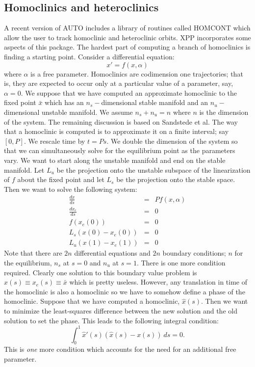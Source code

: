 \documentclass{article}
\begin{document}
\subsection{Homoclinics and heteroclinics}  A recent version of AUTO
includes a library of routines called HOMCONT which allow the user to
track homoclinic and heteroclinic orbits.  XPP incorporates some
aspects of this package. The hardest part of computing a branch of
homoclinics is finding a starting point.  Consider a differential
equation:
\[
 x'=f(x,\alpha)
\]
where $\alpha$ is a free parameter. Homoclinics are codimension one
trajectories; that is, they are expected to occur only at a particular
value of a parameter, say, $\alpha=0.$  We suppose that we have
computed an approximate homoclinic to the fixed point $\bar{x}$ which
has an $n_s-$dimensional stable manifold and an $n_u-$dimensional
unstable manifold. We assume $n_s+n_u=n$ where $n$ is the dimension of
the system. The remaining discussion is based on Sandstede et al.
The way that a homoclinic is computed is to
approximate it on a finite interval; say $[0,P].$ We rescale time by
$t=Ps.$ We double the dimension of the system so that we can
simultaneously solve for the equilibrium point as the parameters vary.
We want to start along the unstable manifold and end on the stable
manifold. Let $L_u$ be the projection onto the unstable subspace of
the linearization of $f$ about the fixed point and let $L_s$ be the
projection onto the stable space.  Then we want to solve the following
system:
\begin{eqnarray*}
\frac{dx}{ds} &=& P f(x,\alpha) \\
\frac{dx_e}{ds}&=& 0 \\
f(x_e(0)) &=& 0 \\
L_s (x(0)-x_e(0)) &=& 0 \\
L_u (x(1)-x_e(1)) &=& 0
\end{eqnarray*}
Note that there are $2n$ differential equations and $2n$ boundary
conditions; $n$ for the equilibrium, $n_s$ at $s=0$ and $n_u$ at
$s=1.$  There is one more condition required.  Clearly one solution to
this boundary value problem is $x(s)\equiv x_e(s)\equiv \bar{x}$ which
is pretty useless.  However, any translation in time of the homoclinic
is also a homoclinic so we have to somehow define a phase of the
homoclinic.  Suppose that we have computed a homoclinic, $\hat{x}(s).$
Then we want to minimize the least-squares difference between the new
solution and the old solution to set the phase. This leads to the
following integral condition:
\[
 \int_0^1 \hat{x}'(s)(\hat{x}(s)-x(s))\ ds = 0.
\]
This is {\em one} more condition which accounts for the need for an
additional free parameter.
\end{document}
